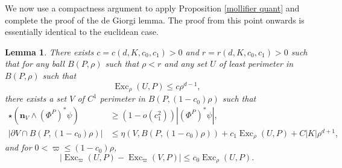 \documentclass[reqno,10pt]{amsart}
\DeclareMathOperator{\Exc}{Exc}
\newcommand{\normal}{\mathbf n}
\newtheorem{lemma}[theorem]{Lemma}
\theoremstyle{definition}
\numberwithin{equation}{section}
\begin{document}
We now use a compactness argument to apply Proposition \ref{mollifier quant} and complete the proof of the de Giorgi lemma.
The proof from this point onwards is essentially identical to the euclidean case.

\begin{lemma}\label{single mollify}
There exists $c = c(d, K, c_0, c_1) > 0$ and $r = r(d, K, c_0, c_1) > 0$ such that for any ball $B(P, \rho)$ such that $\rho < r$ and any set $U$ of least perimeter in $B(P, \rho)$ such that
$$\Exc_\rho (U, P) \leq c\rho^{d - 1},$$
there exists a set $V$ of $C^1$ perimeter in $B(P, (1 - c_0)\rho)$ such that
\begin{align}
\star(\normal_V \wedge (\Phi^P)^* \psi) &\geq (1 - o(c_1^2))|(\Phi^P)^* \psi|, \label{single mollify normal}\\
|\partial V \cap B(P, (1 - c_0)\rho)| &\leq \eta(V, B(P, (1 - c_0)\rho)) + c_1 \Exc_\rho (U, P) + C|K| \rho^{d + 1}, \label{single mollify minimality}
\end{align}
and for $0 < \varpi \leq (1 - c_0)\rho$,
\begin{equation}
|\Exc_\varpi (U, P) - \Exc_\varpi (V, P)| \leq c_0 \Exc_\rho (U, P). \label{single mollify excess}
\end{equation}
\end{lemma}
\end{document}
